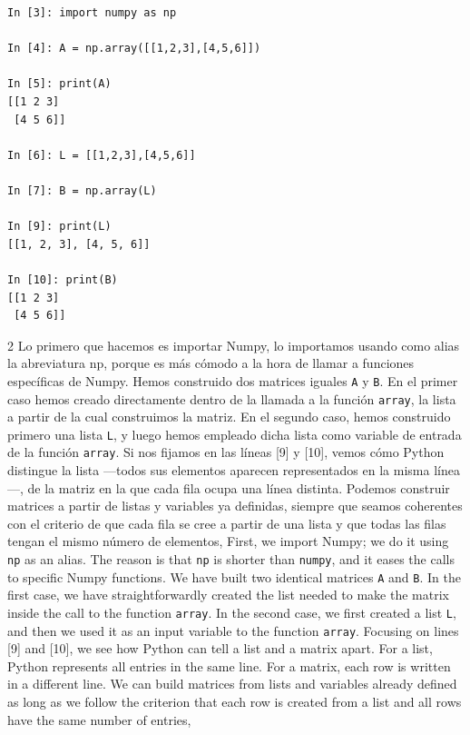\begin{center}
    \begin{minipage}{0.4\textwidth}
    \begin{verbatim}
In [3]: import numpy as np

In [4]: A = np.array([[1,2,3],[4,5,6]])

In [5]: print(A)
[[1 2 3]
 [4 5 6]]

In [6]: L = [[1,2,3],[4,5,6]]

In [7]: B = np.array(L)

In [9]: print(L)
[[1, 2, 3], [4, 5, 6]]

In [10]: print(B)
[[1 2 3]
 [4 5 6]]
 \end{verbatim}
\end{minipage}
 \end{center}
\begin{paracol}{2} 
Lo primero que hacemos es importar Numpy, lo importamos usando como alias la abreviatura np, porque es más cómodo a la hora de llamar a funciones específicas de Numpy.  Hemos construido dos matrices iguales \texttt{A} y \texttt{B}. En el primer caso hemos creado directamente dentro de la llamada a la función \texttt{array}, la lista a partir de la cual construimos la matriz. En el segundo caso, hemos construido primero una lista \texttt{L}, y luego hemos empleado dicha lista como variable de entrada de la función \texttt{array}. Si nos fijamos en las líneas [9] y [10], vemos cómo Python distingue la lista ---todos sus elementos aparecen representados en la misma línea---, de la matriz en la que cada fila ocupa una línea distinta. Podemos construir matrices a partir de listas y variables ya definidas, siempre que seamos coherentes con el criterio de que cada fila se cree a partir de una lista y que todas las filas tengan el mismo número de elementos,
\switchcolumn
First, we import Numpy; we do it using \texttt{np} as an alias. The reason is that \texttt{np} is shorter than \texttt{numpy}, and it eases the calls to specific Numpy functions. We have built two identical matrices \texttt{A} and \texttt{B}. In the first case, we have straightforwardly created the list needed to make the matrix inside the call to the function \texttt{array}. In the second case, we first created a list \texttt{L}, and then we used it as an input variable to the function \texttt{array}. Focusing on lines [9] and [10], we see how Python can tell a list and a matrix apart. For a list, Python represents all entries in the same line. For a matrix, each row is written in a different line.
We can build matrices from lists and variables already defined as long as we follow the criterion that each row is created from a list and all rows have the same number of entries,  
\end{paracol}
